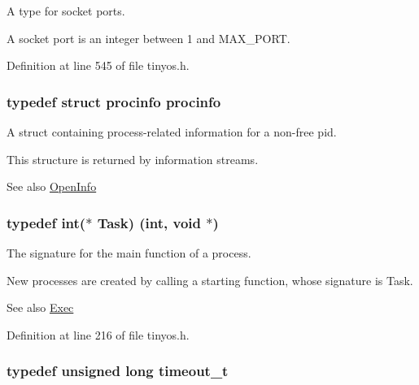 A type for socket ports. 

A socket port is an integer between 1 and {\ttfamily M\+A\+X\+\_\+\+P\+O\+RT}. 

Definition at line 545 of file tinyos.\+h.

\subsubsection[{\texorpdfstring{procinfo}{procinfo}}]{\setlength{\rightskip}{0pt plus 5cm}typedef struct {\bf procinfo}  {\bf procinfo}}\hypertarget{group__syscalls_ga9682d9066f643f8d18cff58fd3fb09b9}{}\label{group__syscalls_ga9682d9066f643f8d18cff58fd3fb09b9}


A struct containing process-\/related information for a non-\/free pid. 

This structure is returned by information streams. \begin{DoxySeeAlso}{See also}
\hyperlink{group__syscalls_gaf326b11574cdc84a9e21b9d860076821}{Open\+Info} 
\end{DoxySeeAlso}
\subsubsection[{\texorpdfstring{Task}{Task}}]{\setlength{\rightskip}{0pt plus 5cm}typedef int($\ast$ Task) (int, void $\ast$)}\hypertarget{group__syscalls_gaec3f2f835e105271fbbc00272c0ba984}{}\label{group__syscalls_gaec3f2f835e105271fbbc00272c0ba984}


The signature for the main function of a process. 

New processes are created by calling a starting function, whose signature is Task. \begin{DoxySeeAlso}{See also}
\hyperlink{group__syscalls_ga737ad30d8105b4b76e3eb102dd016404}{Exec} 
\end{DoxySeeAlso}


Definition at line 216 of file tinyos.\+h.

\subsubsection[{\texorpdfstring{timeout\+\_\+t}{timeout_t}}]{\setlength{\rightskip}{0pt plus 5cm}typedef unsigned long {\bf timeout\+\_\+t}}\hypertarget{group__syscalls_gaf412159e5cef839836a5e7b19ee75d1c}{}\label{group__syscalls_gaf412159e5cef839836a5e7b19ee75d1c}


